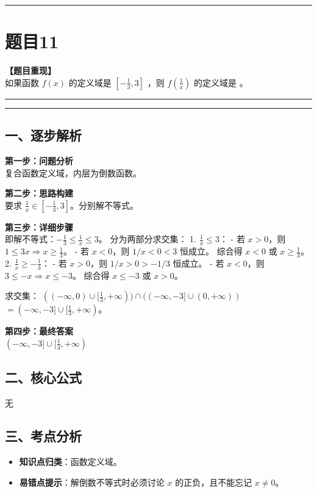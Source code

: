 \documentclass[12pt, a4paper]{ctexart}
\newcommand{\TopSeparator}{
    \par\noindent\rule{\textwidth}{1.5pt}\vspace{0.5em} %
}
\newcommand{\AnalysisSeparator}{
    \par\noindent\rule{\textwidth}{0.5pt}\vspace{0.2em}\hrule\vspace{0.5em} %
}
\newenvironment{RedAnalysis}{
    \par
    \color{red} %
}{
    \par
    \color{black} %
}
\begin{document}
\vspace{2em}

\TopSeparator
\section*{题目11}

\textbf{【题目重现】} \\
如果函数 $ f(x) $ 的定义域是 $ \left[-\frac{1}{3},3\right] $ ，则 $ f(\frac{1}{x}) $ 的定义域是 \underline{\hspace{2cm}}。

\AnalysisSeparator

\begin{RedAnalysis}

\subsection*{一、逐步解析}

\textbf{第一步：问题分析} \\
复合函数定义域，内层为倒数函数。

\textbf{第二步：思路构建} \\
要求 $\frac{1}{x} \in [-\frac{1}{3}, 3]$。分别解不等式。

\textbf{第三步：详细步骤} \\
即解不等式：$-\frac{1}{3} \le \frac{1}{x} \le 3$。
分为两部分求交集：
1. $\frac{1}{x} \le 3$：
   - 若 $x>0$，则 $1 \le 3x \Rightarrow x \ge \frac{1}{3}$。
   - 若 $x<0$，则 $1/x < 0 < 3$ 恒成立。
   综合得 $x < 0$ 或 $x \ge \frac{1}{3}$。
2. $\frac{1}{x} \ge -\frac{1}{3}$：
   - 若 $x>0$，则 $1/x > 0 > -1/3$ 恒成立。
   - 若 $x<0$，则 $3 \le -x \Rightarrow x \le -3$。
   综合得 $x \le -3$ 或 $x > 0$。

求交集：
$( (-\infty, 0) \cup [\frac{1}{3}, +\infty) ) \cap ( (-\infty, -3] \cup (0, +\infty) )$
$= (-\infty, -3] \cup [\frac{1}{3}, +\infty)$。

\textbf{第四步：最终答案} \\
$(-\infty, -3] \cup [\frac{1}{3}, +\infty)$

\subsection*{二、核心公式}
无

\subsection*{三、考点分析}
\begin{itemize}
    \item \textbf{知识点归类}：函数定义域。
    \item \textbf{易错点提示}：解倒数不等式时必须讨论 $x$ 的正负，且不能忘记 $x \ne 0$。
\end{itemize}

\end{RedAnalysis}
\end{document}
